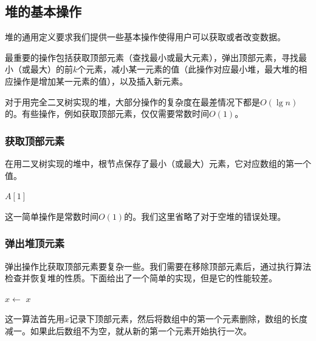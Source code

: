 \documentclass[b5paper]{ctexart}
\begin{document}
\subsection{堆的基本操作}

堆的通用定义要求我们提供一些基本操作使得用户可以获取或者改变数据。

最重要的操作包括获取顶部元素（查找最小或最大元素），弹出顶部元素，寻找最小（或最大）的前$k$个元素，减小某一元素的值（此操作对应最小堆，最大堆的相应操作是增加某一元素的值），以及插入新元素。

对于用完全二叉树实现的堆，大部分操作的复杂度在最差情况下都是$O(\lg n)$的。有些操作，例如获取顶部元素，仅仅需要常数时间$O(1)$。

\subsubsection{获取顶部元素}

在用二叉树实现的堆中，根节点保存了最小（或最大）元素，它对应数组的第一个值。

\begin{algorithmic}[1]
  \State \Return $A[1]$
\EndFunction
\end{algorithmic}

这一简单操作是常数时间$O(1)$的。我们这里省略了对于空堆的错误处理。

\subsubsection{弹出堆顶元素}

弹出操作比获取顶部元素要复杂一些。我们需要在移除顶部元素后，通过执行算法检查并恢复堆的性质。下面给出了一个简单的实现，但是它的性能较差。

\begin{algorithmic}[1]
  \State $x \gets$ 
  \State {}
    \State {}
  \EndIf
  \State \Return $x$
\EndFunction
\end{algorithmic}

这一算法首先用$x$记录下顶部元素，然后将数组中的第一个元素删除，数组的长度减一。如果此后数组不为空，就从新的第一个元素开始执行一次。
\end{document}
